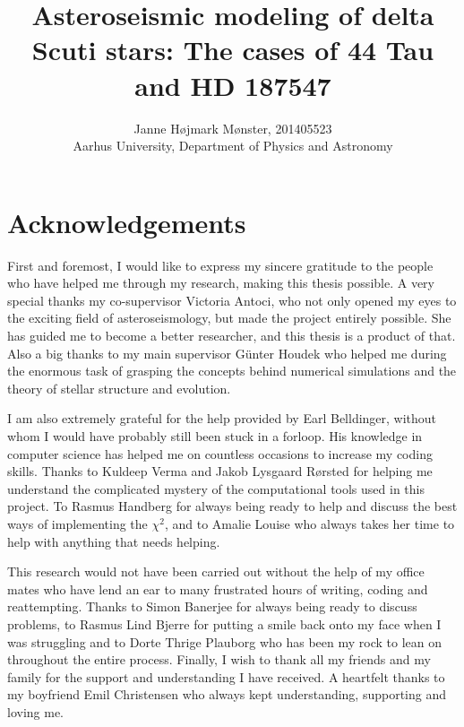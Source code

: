 \documentclass[a4paper,twoside,11pt]{memoir}
\title{Asteroseismic modeling of delta Scuti stars: The cases of 44 Tau and HD 187547}
\author{Janne Højmark Mønster, 201405523\\ Aarhus University, Department of Physics and Astronomy}
\newcommand{\chis}{\ensuremath{\chi^2}\xspace}
\begin{document}
\maketitle
\thispagestyle{empty}
\vspace{0.5cm}
\newpage
\chapter{Acknowledgements}

First and foremost, I would like to express my sincere gratitude to the people who have helped me through my research, making this thesis possible. 
A very special thanks my co-supervisor Victoria Antoci, who not only opened my eyes to the exciting field of asteroseismology, but made the project entirely possible. She has guided me to become a better researcher, and this thesis is a product of that. 
Also a big thanks to my main supervisor Günter Houdek who helped me during the enormous task of grasping the concepts behind numerical simulations and the theory of stellar structure and evolution.  

I am also extremely grateful for the help provided by Earl Belldinger, without whom I would have probably still been stuck in a forloop. His knowledge in computer science has helped me on countless occasions to  increase my coding skills.  Thanks to Kuldeep Verma and Jakob Lysgaard Rørsted for helping me understand the complicated mystery of the computational tools used in this project. To Rasmus Handberg for always being ready to help and discuss the best ways of implementing the \chis, and to Amalie Louise who always takes her time to help with anything that needs helping.  

This research would not have been carried out without the help of my office mates who have lend an ear to many frustrated hours of writing, coding and reattempting. Thanks to Simon Banerjee for always being ready to discuss problems, to Rasmus Lind Bjerre for putting a smile back onto my face when I was struggling and to Dorte Thrige Plauborg who has been my rock to lean on throughout the entire process. 
Finally, I wish to thank all my friends and my family for the support and understanding I have received. A heartfelt thanks to my boyfriend Emil Christensen who always kept understanding, supporting and loving me. 

\newpage
\tableofcontents









\end{document}
